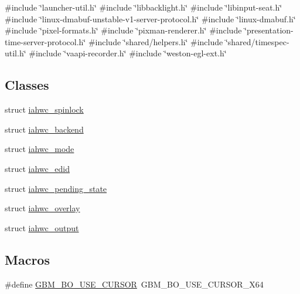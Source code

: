 {\ttfamily \#include \char`\"{}launcher-\/util.\+h\char`\"{}}\newline
{\ttfamily \#include \char`\"{}libbacklight.\+h\char`\"{}}\newline
{\ttfamily \#include \char`\"{}libinput-\/seat.\+h\char`\"{}}\newline
{\ttfamily \#include \char`\"{}linux-\/dmabuf-\/unstable-\/v1-\/server-\/protocol.\+h\char`\"{}}\newline
{\ttfamily \#include \char`\"{}linux-\/dmabuf.\+h\char`\"{}}\newline
{\ttfamily \#include \char`\"{}pixel-\/formats.\+h\char`\"{}}\newline
{\ttfamily \#include \char`\"{}pixman-\/renderer.\+h\char`\"{}}\newline
{\ttfamily \#include \char`\"{}presentation-\/time-\/server-\/protocol.\+h\char`\"{}}\newline
{\ttfamily \#include \char`\"{}shared/helpers.\+h\char`\"{}}\newline
{\ttfamily \#include \char`\"{}shared/timespec-\/util.\+h\char`\"{}}\newline
{\ttfamily \#include \char`\"{}vaapi-\/recorder.\+h\char`\"{}}\newline
{\ttfamily \#include \char`\"{}weston-\/egl-\/ext.\+h\char`\"{}}\newline
\subsection*{Classes}
\begin{DoxyCompactItemize}
\item 
struct \mbox{\hyperlink{structiahwc__spinlock}{iahwc\+\_\+spinlock}}
\item 
struct \mbox{\hyperlink{structiahwc__backend}{iahwc\+\_\+backend}}
\item 
struct \mbox{\hyperlink{structiahwc__mode}{iahwc\+\_\+mode}}
\item 
struct \mbox{\hyperlink{structiahwc__edid}{iahwc\+\_\+edid}}
\item 
struct \mbox{\hyperlink{structiahwc__pending__state}{iahwc\+\_\+pending\+\_\+state}}
\item 
struct \mbox{\hyperlink{structiahwc__overlay}{iahwc\+\_\+overlay}}
\item 
struct \mbox{\hyperlink{structiahwc__output}{iahwc\+\_\+output}}
\end{DoxyCompactItemize}
\subsection*{Macros}
\begin{DoxyCompactItemize}
\item 
\#define \mbox{\hyperlink{compositor-iahwc_8c_ad3aff0f2f31aa1b2db0e50458b5f742c}{G\+B\+M\+\_\+\+B\+O\+\_\+\+U\+S\+E\+\_\+\+C\+U\+R\+S\+OR}}~G\+B\+M\+\_\+\+B\+O\+\_\+\+U\+S\+E\+\_\+\+C\+U\+R\+S\+O\+R\+\_\+X64
\end{DoxyCompactItemize}
